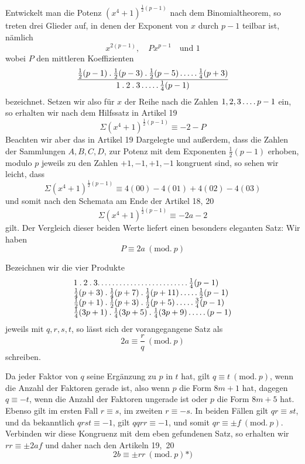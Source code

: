 Entwickelt man die Potenz $(x^4+1)^{\frac12(p-1)}$ nach dem Binomialtheorem, so treten drei Glieder auf, in denen der Exponent von $x$ durch $p-1$ teilbar ist, nämlich
\[
x^{2(p-1)},\quad Px^{p-1}\quad\text{und }1
\]
%
wobei $P$ den mittleren Koeffizienten
\[
\frac{\frac12(p-1)\mathbin{.}\frac12(p-3)\mathbin{.}\frac12(p-5)\mathinner{.\,.\,.\,.\,.}\frac14(p+3)}{1\mathbin{.}2\mathbin{.}3\mathinner{.\,.\,.\,.\,.}\frac14(p-1)}
\]
bezeichnet. Setzen wir also für $x$ der Reihe nach die Zahlen $1,2,3\mathinner{.\,.\,.\,.} p-1$ ein, so erhalten wir nach dem Hilfssatz in Artikel 19
\[
\Sigma(x^4+1)^{\frac12(p-1)}\equiv-2-P
\]
Beachten wir aber das in Artikel 19 Dargelegte und außerdem, dass die Zahlen der Sammlungen $A,B,C,D$, zur Potenz mit dem Exponenten $\frac12(p-1)$ erhoben, modulo $p$ jeweils zu den Zahlen $+1,-1,+1,-1$ kongruent sind, so sehen wir leicht, dass
\[
\Sigma(x^4+1)^{\frac12(p-1)}\equiv4(00)-4(01)+4(02)-4(03)
\]
und somit nach den Schemata am Ende der Artikel 18, 20
\[
\Sigma(x^4+1)^{\frac12(p-1)}\equiv-2a-2
\]
gilt. Der Vergleich dieser beiden Werte liefert einen besonders eleganten Satz: Wir haben
\[
P\equiv2a\ (\mathrm{mod.}\ p)
\]

Bezeichnen wir die vier Produkte
\[
\begin{array}{l}
1\mathbin{.}2\mathbin{.}3\mathpunct{.\,.\,.\,.\,.\,.\,.\,.\,.\,.\,.\,.\,.\,.\,.\,.\,.\,.\,.\,.\,.\,.\,.\,.\,.}\frac14(p-1)\\
\frac14(p+3)\mathbin{.}\frac14(p+7)\mathbin{.}\frac14(p+11)\mathinner{.\,.\,.\,.\,.}\frac12(p-1)\\
\frac12(p+1)\mathbin{.}\frac12(p+3)\mathbin{.}\frac12(p+5)\mathinner{.\,.\,.\,.\,.}\frac34(p-1)\\
\frac14(3p+1)\mathbin{.}\frac14(3p+5)\mathbin{.}\frac14(3p+9)\mathinner{.\,.\,.\,.\,.}(p-1)
\end{array}
\]
jeweils mit $q,r,s,t$, so lässt sich der vorangegangene Satz als
\[
2a\equiv\frac rq\ (\mathrm{mod.}\ p)
\]
schreiben.

Da jeder Faktor von $q$ seine Ergänzung zu $p$ in $t$ hat, gilt $q\equiv t\ (\mathrm{mod.}\ p)$, wenn die Anzahl der Faktoren gerade ist, also wenn $p$ die Form $8m+1$ hat, dagegen $q\equiv-t$, wenn die Anzahl der Faktoren ungerade ist oder $p$ die Form $8m+5$ hat. Ebenso gilt im ersten Fall $r\equiv s$, im zweiten $r\equiv-s$. In beiden Fällen gilt $qr\equiv st$, und da bekanntlich $qrst\equiv-1$, gilt $qqrr\equiv-1$,
%
und somit $qr\equiv\pm f\ (\mathrm{mod.}\ p)$. Verbinden wir diese Kongruenz mit dem eben gefundenen Satz, so erhalten wir $rr\equiv\pm2af$ und daher nach den Artikeln \mbox{19, 20}
\[
2b\equiv\pm rr\ (\mathrm{mod.}\ p)\text{*)}
\]
\begingroup\renewcommand{\thefootnote}{*)}\endgroup

